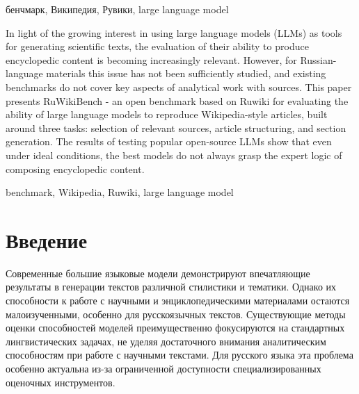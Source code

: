 \documentclass{article}
\begin{document}
\begin{keywords}
бенчмарк, Википедия, Рувики, large language model
\end{keywords}

\begin{altabstract}
In light of the growing interest in using large language models (LLMs) as tools for generating scientific texts,
the evaluation of their ability to produce encyclopedic content is becoming increasingly relevant.
However, for Russian-language materials this issue has not been sufficiently studied, and existing benchmarks do not cover key aspects of analytical work with sources.
This paper presents RuWikiBench - an open benchmark based on Ruwiki for evaluating the ability of large language models to reproduce Wikipedia-style articles,
built around three tasks:
selection of relevant sources, article structuring, and section generation.
The results of testing popular open-source LLMs show that even under ideal conditions, the best models do not always grasp the expert logic of composing encyclopedic content.
\end{altabstract}

\begin{altkeywords}
benchmark, Wikipedia, Ruwiki, large language model
\end{altkeywords}

\section*{Введение}

Современные большие языковые модели демонстрируют впечатляющие результаты в генерации текстов различной стилистики и тематики. 
Однако их способности к работе с научными и энциклопедическими материалами остаются малоизученными, особенно для русскоязычных текстов.
Существующие методы оценки способностей моделей преимущественно фокусируются на стандартных лингвистических задачах, не уделяя достаточного внимания аналитическим способностям при работе с научными текстами.
Для русского языка эта проблема особенно актуальна из-за ограниченной доступности специализированных оценочных инструментов.
\end{document}
